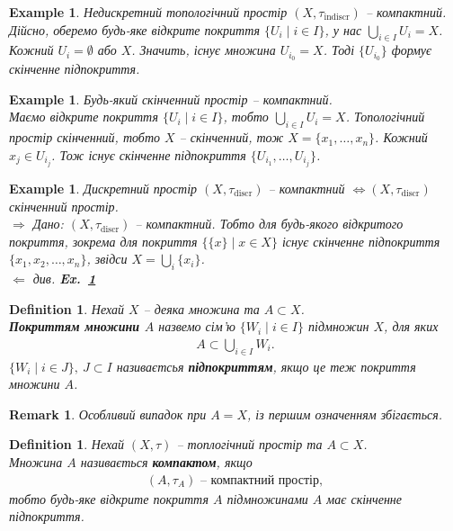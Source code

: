 \documentclass[a4paper, 10pt]{article}
\def\rightproof{$\boxed{\Rightarrow}$ }
\def\leftproof{$\boxed{\Leftarrow}$ }
\theoremstyle{theoremdd}
\newtheorem{definition}[theorem]{Definition}
\newtheorem{example}[theorem]{Example}
\newtheorem{remark}[theorem]{Remark}
\newcommand\exref[1]{\textbf{Ex.~\ref{#1}}}
\begin{document}
\begin{example}
Недискретний топологічний простір $(X,\tau_{\text{indiscr}})$ -- компактний.\\
Дійсно, оберемо будь-яке відкрите покриття $\{U_i \mid i \in I\}$, у нас $\displaystyle\bigcup_{i \in I} U_i = X$. Кожний $U_i = \emptyset$ або $X$. Значить, існує множина $U_{i_0} = X$. Тоді $\{U_{i_0}\}$ формує скінченне підпокриття.
\end{example}

\begin{example}
\label{finite_is_compact}
Будь-який скінченний простір -- компактний.\\
Маємо відкрите покриття $\{U_i \mid i \in I\}$, тобто $\displaystyle\bigcup_{i \in I} U_i = X$. Топологічний простір скінченний, тобто $X$ -- скінченний, тож $X = \{x_1,\dots,x_n\}$. Кожний $x_j \in U_{i_j}$. Тож існує скінченне підпокриття $\{U_{i_1},\dots,U_{i_j}\}$.
\end{example}

\begin{example}
Дискретний простір $(X,\tau_{\text{discr}})$ -- компактний $\iff (X,\tau_{\text{discr}})$ скінченний простір.\\
\rightproof Дано: $(X,\tau_{\text{discr}})$ -- компактний. Тобто для будь-якого відкритого покриття, зокрема для покриття $\{ \{x\} \mid x \in X\}$ існує скінченне підпокриття $\{ x_1,x_2,\dots,x_n\}$, звідси $X = \displaystyle\bigcup_i \{x_i\}$.\\
\leftproof \textit{див.} \exref{finite_is_compact}
\end{example}

\begin{definition}
Нехай $X$ -- деяка множина та $A \subset X$.\\
\textbf{Покриттям множини $A$} назвемо сім'ю $\{W_i \mid i \in I\}$ підмножин $X$, для яких
\begin{align*}
A \subset \bigcup_{i \in I} W_i.
\end{align*}
$\{W_i \mid i \in J\},\ J \subset I$ називаєтсья \textbf{підпокриттям}, якщо це теж покриття множини $A$.
\end{definition}

\begin{remark}
Особливий випадок при $A = X$, із першим означенням збігається.
\end{remark}

\begin{definition}
Нехай $(X,\tau)$ -- топлогічний простір та $A \subset X$.\\
Множина $A$ називається \textbf{компактом}, якщо
\begin{align*}
(A,\tau_A) \text{ -- компактний простір},
\end{align*}
тобто будь-яке відкрите покриття $A$ підмножинами $A$ має скінченне підпокриття.
\end{definition}
\end{document}
